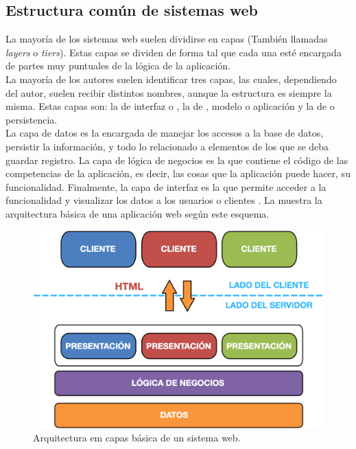 \subsection{Estructura común de sistemas web}
\label{subsec:intro:jvm_dev:structure}

La mayoría de los sistemas web suelen dividirse en capas (También llamadas
\emph{layers} o \emph{tiers}). Estas capas se dividen de forma tal que
cada una esté encargada de partes muy puntuales de la lógica de la aplicación.\\
La mayoría de los autores  suelen identificar tres capas, las cuales, 
dependiendo del autor, suelen recibir distintos nombres, aunque la estructura 
es siempre la misma. Estas capas son: la de interfaz o \view, la de \logic,
modelo o aplicación y la de \data o persistencia.\\
La capa de datos es la encargada de manejar los accesos a la base de datos, 
persistir la información, y todo lo relacionado a elementos de los que se deba 
guardar registro. La capa de lógica de negocios es la que contiene el código de 
las competencias de la aplicación, es decir, las cosas que la aplicación puede 
hacer, su funcionalidad. Finalmente, la capa de interfaz es la que permite 
acceder a la funcionalidad y visualizar los datos a los usuarios o clientes 
. La  
muestra la arquitectura básica de una aplicación web según este esquema.\\

\begin{figure}[tb]
	\centering
	\includegraphics[]{figures/web_arch.png}
	\caption{Arquitectura em capas básica de un sistema web.}
	\label{fig:intro:jvm:web_arch}
\end{figure}
 
